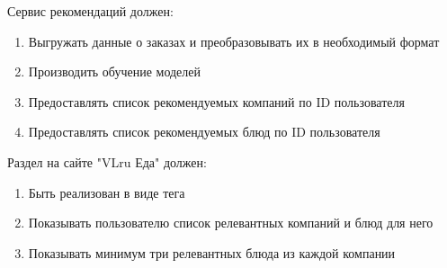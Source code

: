 Сервис рекомендаций должен:
\begin{enumerate}
  \item Выгружать данные о заказах и преобразовывать их в необходимый формат
  \item Производить обучение моделей
  \item Предоставлять список рекомендуемых компаний по ID пользователя
  \item Предоставлять список рекомендуемых блюд по ID пользователя
\end{enumerate}

Раздел на сайте "VLru Еда" должен:
\begin{enumerate}
  \item Быть реализован в виде тега
  \item Показывать пользователю список релевантных компаний и блюд для него
  \item Показывать минимум три релевантных блюда из каждой компании
\end{enumerate}
